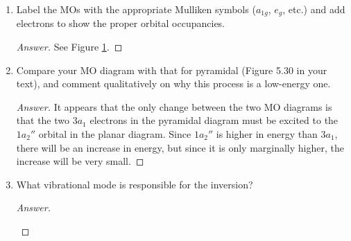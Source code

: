 \documentclass[../psets.tex]{subfiles}
\begin{document}
\begin{enumerate}[label={\Roman*)}]
\begin{enumerate}[label={\alph*)}]
\begin{proof}[Answer]
\begin{figure}[H]
                \caption{Planar ${\ce{NH3}}^\ddagger$ orbital diagram.}
                \label{fig:orbitalDiagram-NH3-planar}
            \end{figure}
        \end{proof}
        \item Label the MOs with the appropriate Mulliken symbols ($a_{1g}$, $e_g$, etc.) and add electrons to show the proper orbital occupancies.
        \begin{proof}[Answer]
            See Figure \ref{fig:orbitalDiagram-NH3-planar}.
        \end{proof}
        \item Compare your MO diagram with that for pyramidal  (Figure 5.30 in your text), and comment qualitatively on why this process is a low-energy one.
        \begin{proof}[Answer]
            It appears that the only change between the two MO diagrams is that the two $3a_1$ electrons in the pyramidal  diagram must be excited to the $1a_2''$ orbital in the planar  diagram. Since $1a_2''$ is higher in energy than $3a_1$, there will be an increase in energy, but since it is only marginally higher, the increase will be very small.
        \end{proof}
        \item What vibrational mode is responsible for the inversion?
        \begin{proof}[Answer]
            ${\color{white}hi}$
            \begin{figure}[H]
                \centering
                \vspace{1em}
                \footnotesize

\end{figure}
\end{proof}
\end{enumerate}
\end{enumerate}
\end{document}
